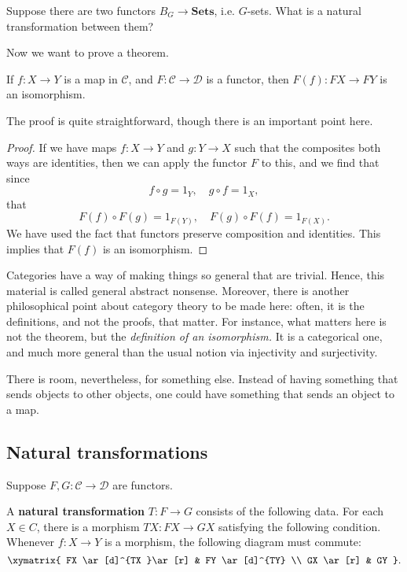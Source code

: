 \begin{exercise}
 Suppose there are  two functors $B_G \to
\mathbf{Sets}$, i.e. $G$-sets. What is a natural transformation between them?
\end{exercise}

Now we want to prove a theorem.
\begin{proposition}
If $f: X \to Y$ is a map in $\mathcal{C}$, and $F: \mathcal{C} \to \mathcal{D}$
is a functor, then $F(f): FX \to FY$ is an isomorphism.
\end{proposition}

The proof is quite straightforward, though there is an important point here.


\begin{proof}
If we have maps $f: X \to Y$ and $g : Y \to X$ such that the composites both
ways are identities, then we can apply the functor $F$ to this, and we find
that since
\[ f \circ g = 1_Y, \quad g \circ f = 1_X,   \]
that
\[ F(f) \circ F(g) = 1_{F(Y)}, \quad F(g) \circ F(f) = 1_{F(X)}.  \]
We have used the fact that functors preserve composition and identities. This
implies that $F(f)$ is an isomorphism.
\end{proof}

Categories have a way of making things so general that are trivial. Hence,
this material is called general abstract nonsense.
Moreover, there is another philosophical point about category theory to
be made here: often, it is the definitions, and not the proofs, that matter.
For instance, what matters here is not the theorem, but the \emph{definition of
an
isomorphism.} It is a categorical one, and much more general than the usual
notion via injectivity and surjectivity.


There is room, nevertheless, for something else. Instead of having
something that sends objects to other objects, one could have something that
sends an object to a map.



\subsection{Natural transformations}



Suppose $F, G: \mathcal{C} \to \mathcal{D}$ are functors.

\begin{definition}
A \textbf{natural transformation} $T: F \to G$ consists of the following data.
For each $X \in C$, there is a morphism $TX: FX \to GX$ satisfying the
following
condition. Whenever $f: X \to Y$ is a morphism, the following diagram must
commute:
\[ \xymatrix{
FX \ar[d]^{TX }\ar[r] &  FY \ar[d]^{TY}  \\
GX \ar[r] &  GY
}.\]
\end{definition}

